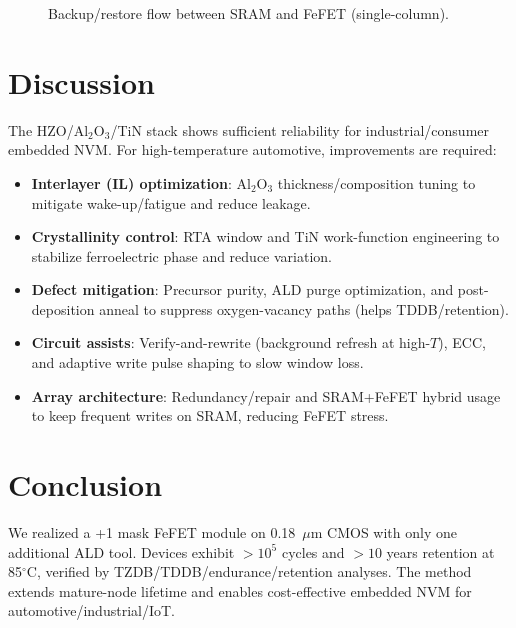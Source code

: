 \documentclass[conference]{IEEEtran}
\begin{document}
\begin{figure}[!t]
  \centering
  \caption{Backup/restore flow between SRAM and FeFET (single-column).}
  \label{fig:backup_flow}
\end{figure}

\section{Discussion}
The HZO/Al$_2$O$_3$/TiN stack shows sufficient reliability for industrial/consumer embedded NVM.
For high-temperature automotive, improvements are required:
\begin{itemize}
  \item \textbf{Interlayer (IL) optimization}: Al$_2$O$_3$ thickness/composition tuning to mitigate wake-up/fatigue and reduce leakage.
  \item \textbf{Crystallinity control}: RTA window and TiN work-function engineering to stabilize ferroelectric phase and reduce variation.
  \item \textbf{Defect mitigation}: Precursor purity, ALD purge optimization, and post-deposition anneal to suppress oxygen-vacancy paths (helps TDDB/retention).
  \item \textbf{Circuit assists}: Verify-and-rewrite (background refresh at high-$T$), ECC, and adaptive write pulse shaping to slow window loss.
  \item \textbf{Array architecture}: Redundancy/repair and SRAM+FeFET hybrid usage to keep frequent writes on SRAM, reducing FeFET stress.
\end{itemize}

\section{Conclusion}
We realized a +1 mask FeFET module on 0.18~$\mu$m CMOS with only one additional ALD tool.
Devices exhibit $>10^5$ cycles and $>10$ years retention at 85$^\circ$C, verified by TZDB/TDDB/endurance/retention analyses.
The method extends mature-node lifetime and enables cost-effective embedded NVM for automotive/industrial/IoT.
\end{document}
